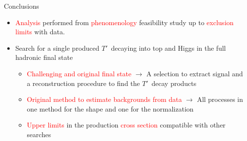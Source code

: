 \documentclass[usenames,dvipsnames]{beamer}
\newcommand{\Tp}{$T'$}
\begin{document}
\begin{frame}{Conclusions}
\begin{block}{}
\begin{itemize}
\begin{itemize}
    \end{itemize}
  \item \textcolor{red}{Analysis} performed from \textcolor{red}{phenomenology} feasibility study up to \textcolor{red}{exclusion limits} with data.
  \item Search for a single produced \Tp~decaying into top and Higgs in the full hadronic final state
    \begin{itemize}\scriptsize
    \item \textcolor{red}{Challenging and original final state} $\to$ A selection to extract signal and a reconstruction procedure to find the \Tp~decay products
    \item \textcolor{red}{Original method to estimate backgrounds from data} $\to$ All processes in one method for the shape and one for the normalization
    \item \textcolor{red}{Upper limits} in the production \textcolor{red}{cross section} compatible with other searches
    \end{itemize}
\end{itemize}
\end{block}
\end{frame}
\end{document}
